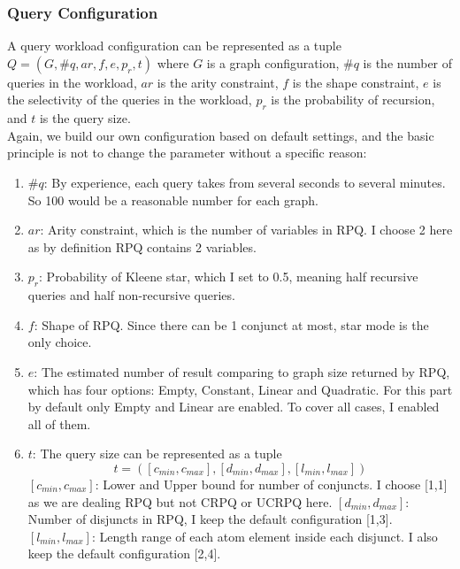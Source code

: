 \subsubsection{Query Configuration}
A query workload configuration can be represented as a tuple $Q = (G, \#q, ar, f, e, p_r, t)$ where $G$ is a graph configuration, $\#q$ is the number of queries in the workload, $ar$ is the arity constraint, $f$ is the shape constraint, $e$ is the selectivity of the queries in the workload, $p_r$ is the probability of recursion, and $t$ is the query size.\\
Again, we build our own configuration based on default settings, and the basic principle is not to change the parameter without a specific reason:
\begin{enumerate}
    \item $\#q$: By experience, each query takes from several seconds to several minutes. So 100 would be a reasonable number for each graph.
    \item $ar$: Arity constraint, which is the number of variables in RPQ. I choose 2 here as by definition RPQ contains 2 variables.
    \item $p_r$: Probability of Kleene star, which I set to 0.5, meaning half recursive queries and half non-recursive queries.
    \item $f$: Shape of RPQ. Since there can be 1 conjunct at most, star mode is the only choice.
    \item $e$: The estimated number of result comparing to graph size returned by RPQ, which has four options: Empty, Constant, Linear and Quadratic. For this part by default only Empty and Linear are enabled. To cover all cases, I enabled all of them.
    \item $t$: The query size can be represented as a tuple $$t=([c_{min},c_{max}],[d_{min},d_{max}],[l_{min},l_{max}])$$
    \subitem $[c_{min},c_{max}]$: Lower and Upper bound for number of conjuncts. I choose [1,1] as we are dealing RPQ but not CRPQ or UCRPQ here.
    \subitem $[d_{min},d_{max}]$: Number of disjuncts in RPQ, I keep the default configuration [1,3].
    \subitem $[l_{min},l_{max}]$: Length range of each atom element inside each disjunct. I also keep the default configuration [2,4].
\end{enumerate}